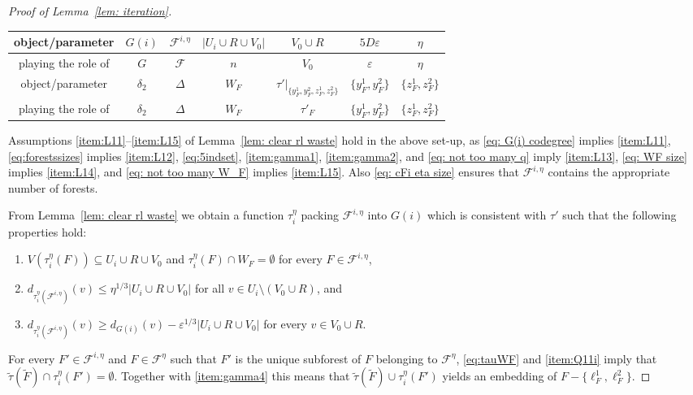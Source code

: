 \documentclass[a4paper, 11pt, reqno]{amsart}
\numberwithin{equation}{section}
\newcommand{\1}{{\rm 1\hspace*{-0.4ex}%
\rule{0.1ex}{1.52ex}\hspace*{0.2ex}}}
\newcommand{\es}{\emptyset}
\newcommand{\cF}{\mathcal{F}}
\newcommand{\sF}{\mathscr{F}}
\renewcommand{\epsilon}{\varepsilon}
\newcommand{\sub}{\subseteq}
\begin{document}
\begin{proof}[Proof of Lemma~\ref{lem: iteration}]
\noindent
{
\begin{tabular}{c|c|c|c|c|c|c}
object/parameter & $G(i)$& $ \sF^{i,\eta} $& $|U_i\cup R\cup V_0|$ & $V_0\cup R$ & $5D \epsilon$ &$\eta$ 
\\ \hline
playing the role of & $G$ &$\cF$ & $n$ & $V_0$ & $\epsilon$ & $\eta$ 
\\ \hline 
\hline
object/parameter &  $\delta_2$& $\Delta$& $W_{F}$ & $\tau'|_{\{y^1_F, y^2_F, z^1_F, z^2_F\}}$ & $\{y^1_F,y^2_F\}$ & $\{z^1_F, z^2_F\}$  
\\ \hline
playing the role of & $\delta_2$ & $\Delta$ & $W_F$& $\tau'_F$& $\{y^1_F, y^2_F\}$& $\{z^1_F,z^2_F\}$
\end{tabular}
}\newline \vspace{0.2cm}

\noindent
Assumptions \ref{item:L11}--\ref{item:L15}  of Lemma~\ref{lem: clear rl waste} hold in the above set-up, 
as \eqref{eq: G(i) codegree} implies \ref{item:L11}, 
\eqref{eq:forestssizes} implies \ref{item:L12}, 
\eqref{eq:5indset}, \ref{item:gamma1}, \ref{item:gamma2}, and \eqref{eq: not too many q} imply \ref{item:L13}, 
\eqref{eq: WF size} implies \ref{item:L14}, and \eqref{eq: not too many W_F} implies \ref{item:L15}. 
Also \eqref{eq: cFi eta size} ensures that $\sF^{i,\eta}$ contains the appropriate number of forests. 

From Lemma~\ref{lem: clear rl waste}
we obtain a function $\tau^{\eta}_i$ packing $\sF^{i,\eta}$ into $G(i)$ which is consistent with $\tau'$ such that the following properties hold:
\begin{enumerate}[label=(Q1.\arabic*)$_i$]
\item\label{item:Q11i} $V(\tau_i^\eta(F))\sub U_i \cup R\cup V_0$ and $\tau^{\eta}_i(F)\cap W_F=\emptyset$ for every $F\in \sF^{i,\eta}$,
\item\label{item:Q12i}  $d_{\tau^{\eta}_i(\sF^{i,\eta})}(v)\leq \eta^{1/3}| U_i \cup R\cup V_0|$ for all $v\in U_i\setminus(V_0\cup R)$, and
\item\label{item:Q13i}  $d_{\tau^{\eta}_i(\sF^{i,\eta})}(v) \geq d_{G(i)}(v) - \epsilon^{1/3} | U_i \cup R\cup V_0|$ for every $v\in V_0\cup R$.
\end{enumerate}
For every $F'\in \sF^{i,\eta}$ and $F\in \cF^\eta$ such that 
$F'$ is the unique subforest of $F$ belonging to $\sF^\eta$,
\eqref{eq:tauWF} and \ref{item:Q11i} imply 
that $\tilde{\tau}(\tilde{F})\cap \tau^\eta_i(F')=\es$. Together with \ref{item:gamma4} this means that $\tilde{\tau}(\tilde{F}) \cup \tau^\eta_i(F')$ yields an embedding of $F - \{\ell^1_F, \ell^2_F\}$.


\end{proof}
\end{document}

